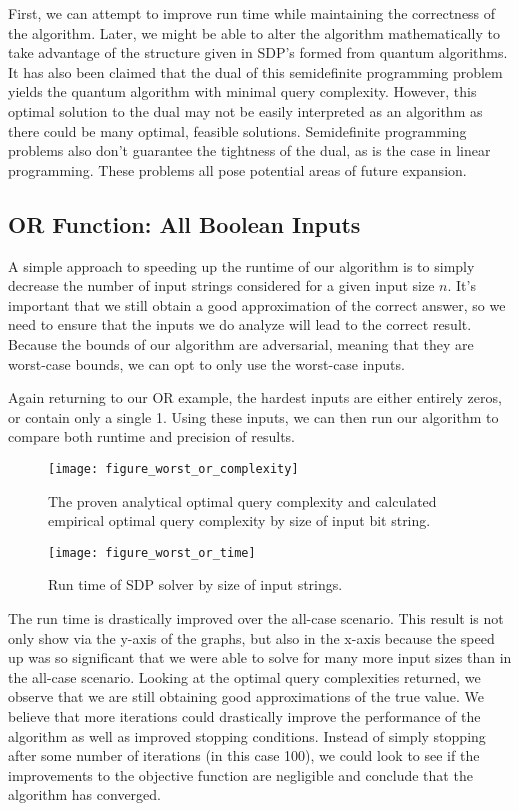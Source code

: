 First, we can attempt to improve run time while
maintaining the correctness of the algorithm. Later,
we might be able to alter the algorithm
mathematically to take advantage of the structure
given in SDP's formed from quantum algorithms. 
It has also been claimed that the dual of this semidefinite
programming problem yields the quantum algorithm with minimal query complexity.
However, this optimal solution to the dual may not be easily 
interpreted as an algorithm as there could be many optimal, feasible solutions. 
Semidefinite programming problems also don't guarantee the tightness of the dual,
as is the case in linear programming. 
These problems all pose potential areas of future expansion.

\subsection{OR Function: All Boolean Inputs}

A simple approach to speeding up the runtime of our
algorithm is to simply decrease the number of input
strings considered for a given input size $n$. It's
important that we still obtain a good approximation
of the correct answer, so we need to ensure that the
inputs we do analyze will lead to the correct result.
Because the bounds of our algorithm are adversarial,
meaning that they are worst-case bounds, we can opt
to only use the worst-case inputs.

Again returning to our OR example, the hardest inputs are either entirely zeros, or contain only a single 1. Using these inputs, we can then run our algorithm to compare both runtime and precision of results.

\begin{figure}[ht]
\centering
\texttt{[image: figure\_worst\_or\_complexity]}
\caption{The proven analytical optimal query complexity
and calculated empirical optimal query complexity by 
size of input bit string.}
\end{figure}

\begin{figure}[ht]
\centering
\texttt{[image: figure\_worst\_or\_time]}
\caption{Run time of SDP solver by size of input strings.}
\end{figure}

The run time is drastically improved over the all-case scenario. This result is not only show via the y-axis of the graphs, but also in the x-axis because the speed up was so significant that we were able to solve for many more input sizes than in the all-case scenario. 
Looking at the optimal query complexities returned, we observe that we are still obtaining good approximations of the true value. We believe that more iterations could drastically improve the performance of the algorithm as well as improved stopping conditions. Instead of simply stopping after some number of iterations (in this case 100), we could look to see if the improvements to the objective function are negligible and conclude that the algorithm has converged.
